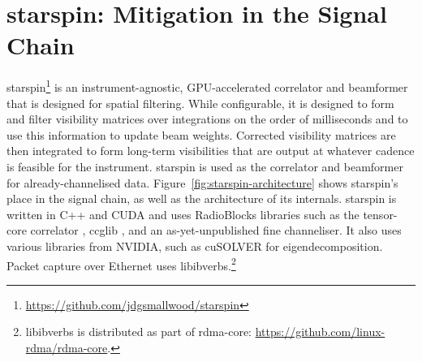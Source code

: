 \documentclass[11pt,twoside]{article}
\begin{document}


\section{starspin: Mitigation in the Signal Chain}

starspin\footnote{\url{https://github.com/jdgsmallwood/starspin}} is an instrument-agnostic, GPU-accelerated correlator and beamformer that is designed for spatial filtering.
While configurable, it is designed to form and filter visibility matrices over integrations on the order of milliseconds and to use this information to update beam weights.
Corrected visibility matrices are then integrated to form long-term visibilities that are output at whatever cadence is feasible for the instrument. 
starspin is used as the correlator and beamformer for already-channelised data.
Figure~\ref{fig:starspin-architecture} shows starspin's place in the signal chain, as well as the architecture of its internals. 
starspin is written in C++ and CUDA and uses RadioBlocks libraries such as the tensor-core correlator \citep{romein_tensor-core_2021}, ccglib \citep{oostrum_ccglib}, and an as-yet-unpublished fine channeliser.
It also uses various libraries from NVIDIA, such as cuSOLVER for eigendecomposition. Packet capture over Ethernet uses libibverbs.\footnote{libibverbs is distributed as part of rdma-core: \url{https://github.com/linux-rdma/rdma-core}.}
\end{document}
